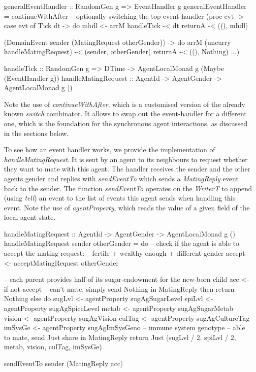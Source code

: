 \begin{HaskellCode}              
generalEventHandler :: RandomGen g => EventHandler g
generalEventHandler =
  continueWithAfter -- optionally switching the top event handler 
    (proc evt -> 
      case evt of 
        Tick dt -> do
          mhdl <- arrM handleTick -< dt
          returnA -< ((), mhdl)

        (DomainEvent sender (MatingRequest otherGender)) -> do
          arrM (uncurry handleMatingRequest) -< (sender, otherGender)
          returnA -< ((), Nothing)
        ...)
        
handleTick :: RandomGen g => DTime -> AgentLocalMonad g (Maybe (EventHandler g))
handleMatingRequest :: AgentId -> AgentGender -> AgentLocalMonad g ()
\end{HaskellCode}

Note the use of \textit{continueWithAfter}, which is a customised version of the already known \textit{switch} combinator. It allows to swap out the event-handler for a different one, which is the foundation for the synchronous agent interactions, as discussed in the sections below.

To see how an event handler works, we provide the implementation of \textit{handleMatingRequest}. It is sent by an agent to its neighbours to request whether they want to mate with this agent. The handler receives the sender and the other agents gender and replies with \textit{sendEventTo} which sends a \textit{MatingReply} event back to the sender. The function \textit{sendEventTo} operates on the \textit{WriterT} to append (using \textit{tell}) an event to the list of events this agent sends when handling this event. Note the use of \textit{agentProperty}, which reads the value of a given field of the local agent state. 

\begin{HaskellCode}
handleMatingRequest :: AgentId
                    -> AgentGender
                    -> AgentLocalMonad g ()
handleMatingRequest sender otherGender = do
  -- check if the agent is able to accept the mating request: 
  -- fertile + wealthy enough + different gender
  accept <- acceptMatingRequest otherGender

  -- each parent provides half of its sugar-endowment for the new-born child
  acc <- if not accept
      -- can't mate, simply send Nothing in MatingReply
      then return Nothing
      else do
        sugLvl  <- agentProperty sugAgSugarLevel
        spiLvl  <- agentProperty sugAgSpiceLevel
        metab   <- agentProperty sugAgSugarMetab
        vision  <- agentProperty sugAgVision
        culTag  <- agentProperty sugAgCultureTag
        imSysGe <- agentProperty sugAgImSysGeno -- immune system genotype
        -- able to mate, send Just share in MatingReply
        return Just (sugLvl / 2, spiLvl / 2, metab, vision, culTag, imSysGe)

  sendEventTo sender (MatingReply acc)
\end{HaskellCode}

